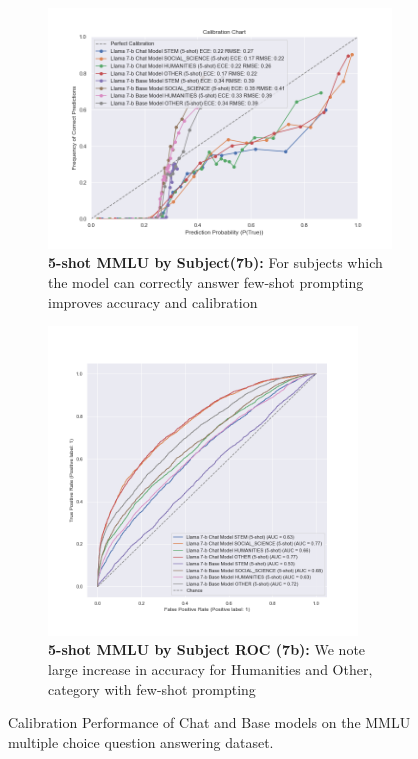 \documentclass[11pt]{article}
\begin{document}
\begin{figure}
     \hfill
     \begin{subfigure}[b]{0.60\textwidth}
         \centering
         \includegraphics[width=1.1\textwidth]{figures/5-shot-MMLU-subjects-7b.png}
         \caption{\textbf{5-shot MMLU by Subject(7b):}  For subjects which the model can correctly 
         answer few-shot prompting improves accuracy and calibration}
         \label{fig:5-shot-logicqa}
     \end{subfigure}     
    \hfill 
     \begin{subfigure}[b]{0.38\textwidth}
         \centering \includegraphics[width=0.9\textwidth]{figures/5-shot-MMLU-subjects-7b-roc.png}
         \caption{\textbf{5-shot MMLU by Subject ROC (7b):} We note large increase in accuracy for 
         Humanities and Other, category with few-shot prompting}
         \label{fig:0-shot-MMLU}
    \end{subfigure} 
    
        \caption{Calibration Performance of Chat and Base models on the MMLU multiple choice question answering dataset.}
        \label{fig:three graphs}
\end{figure}
\end{document}
